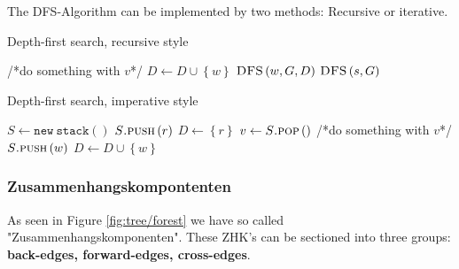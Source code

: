 \documentclass[a4paper]{article}
\begin{document}
The DFS-Algorithm can be implemented by two methods: Recursive or iterative.
\begin{algorithm}[H]
  \caption{Depth-first search, recursive style}
  \begin{algorithmic}
    \State /*do something with $v$*/
    \State $D \gets D \cup \left\lbrace w \right\rbrace$
    \State $\textsc{DFS}\left(w, G, D \right)$
    \EndIf
    \EndFor
    \EndFunction
    \label{alg:DFS-Recursive}
    \State $\textsc{DFS}\left(s, G\right)$
  \end{algorithmic}
\end{algorithm}

\begin{algorithm}[H]
  \caption{Depth-first search, imperative style}
  \begin{algorithmic}
    \State $S \gets \texttt{new}~\texttt{stack}\left(\right)$
    \State $S\textsc{.push}\left(r\right)$
    \State $D \gets \left\lbrace r \right\rbrace$
    \State $v \gets S\textsc{.pop}\left(\right)$
    \State /*do something with $v$*/
    \State $S\textsc{.push}\left(w\right)$
    \State $D \gets D \cup \left\lbrace w \right\rbrace$
    \EndIf
    \EndFor
    \EndWhile
        \label{alg:DFS-Iterative}
  \end{algorithmic}
\end{algorithm}

\subsubsection{Zusammenhangskompontenten}\label{ZSMkomponenten}
    As seen in Figure \ref{fig:tree/forest} we have so called "Zusammenhangskomponenten". These ZHK's can be sectioned into three groups: \textbf{ back-edges, forward-edges, cross-edges}.
\end{document}
